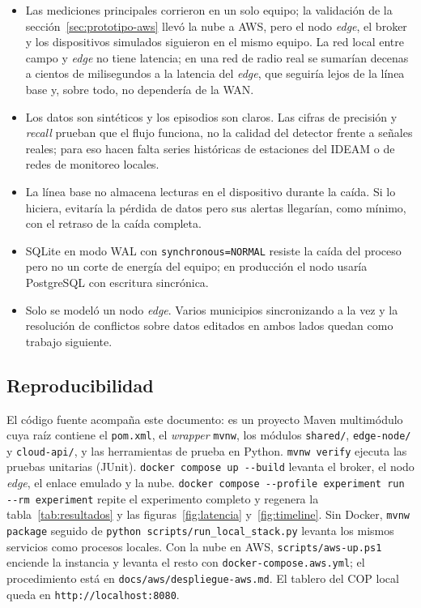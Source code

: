 \begin{itemize}[leftmargin=*]
  \item Las mediciones principales corrieron en un solo equipo; la
        validación de la sección~\ref{sec:prototipo-aws} llevó la nube a AWS,
        pero el nodo \emph{edge}, el broker y los dispositivos simulados
        siguieron en el mismo equipo. La red local entre campo y \emph{edge}
        no tiene latencia; en una red de radio real se sumarían decenas a
        cientos de milisegundos a la latencia del \emph{edge}, que seguiría
        lejos de la línea base y, sobre todo, no dependería de la WAN.
  \item Los datos son sintéticos y los episodios son claros. Las cifras de
        precisión y \emph{recall} prueban que el flujo funciona, no la calidad
        del detector frente a señales reales; para eso hacen falta series
        históricas de estaciones del IDEAM o de redes de monitoreo locales.
  \item La línea base no almacena lecturas en el dispositivo durante la caída.
        Si lo hiciera, evitaría la pérdida de datos pero sus alertas
        llegarían, como mínimo, con el retraso de la caída completa.
  \item SQLite en modo WAL con \texttt{synchronous=NORMAL} resiste la caída del
        proceso pero no un corte de energía del equipo; en producción el nodo
        usaría PostgreSQL con escritura sincrónica.
  \item Solo se modeló un nodo \emph{edge}. Varios municipios sincronizando a
        la vez y la resolución de conflictos sobre datos editados en ambos
        lados quedan como trabajo siguiente.
\end{itemize}

\subsection{Reproducibilidad}

El código fuente acompaña este documento: es un proyecto Maven multimódulo
cuya raíz contiene el \texttt{pom.xml}, el \emph{wrapper} \texttt{mvnw}, los
módulos \texttt{shared/}, \texttt{edge-node/} y \texttt{cloud-api/}, y las
herramientas de prueba en Python. \texttt{mvnw verify} ejecuta las pruebas
unitarias (JUnit). \texttt{docker compose up -{}-build} levanta el broker, el
nodo \emph{edge}, el enlace emulado y la nube. \texttt{docker compose -{}-profile
experiment run -{}-rm experiment} repite el experimento completo y regenera la
tabla~\ref{tab:resultados} y las figuras~\ref{fig:latencia}
y~\ref{fig:timeline}. Sin Docker, \texttt{mvnw package} seguido de
\texttt{python scripts/run\_local\_stack.py} levanta los mismos servicios como
procesos locales. Con la nube en AWS, \texttt{scripts/aws-up.ps1} enciende la
instancia y levanta el resto con \texttt{docker-compose.aws.yml}; el
procedimiento está en \texttt{docs/aws/despliegue-aws.md}. El tablero del COP
local queda en \texttt{http://localhost:8080}.

